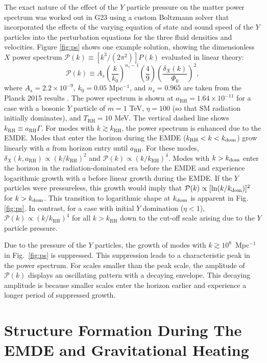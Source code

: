 \documentclass[a4paper,11pt]{article}
\newcommand{\rh}[1]{{#1}_{\mathrm{RH}}}
\begin{document}
The exact nature of the effect of the $Y$ particle pressure on the matter power spectrum was worked out in G23 using a custom Boltzmann solver that incorporated the effects of the varying equation of state and sound speed of the $Y$ particles into the perturbation equations for the three fluid densities and velocities. Figure \ref{fig:ps} shows one example solution, showing the dimensionless $X$ power spectrum $\mathcal{P}(k)\equiv[k^3/(2\pi^2)]P(k)$ evaluated in linear theory: \begin{equation}
    \mathcal{P}(k) \equiv A_s \left(\frac{k}{k_0} \right)^{n_s-1} \left( \frac{4}{9} \right) \left(\frac{\delta_X(k)}{\Phi_0} \right)^2,
\end{equation} where $A_s = 2.2 \times 10^{-9}$, $k_0 = 0.05$ Mpc$^{-1}$, and $n_s = 0.965$ are taken from the Planck 2015 results \cite{planck15}. The power spectrum is shown at $\rh{a} = 1.64 \times 10^{-11}$ for a case with a bosonic $Y$ particle of $m = 1$ TeV, $\eta = 100$ (so that SM radiation initially dominates), and $\rh{T} = 10$ MeV. The vertical dashed line shows $\rh{k} \equiv \rh{a} \Gamma$. For modes with $k \gtrsim \rh{k}$, the power spectrum is enhanced due to the EMDE. Modes that enter the horizon during the EMDE ($\rh{k} < k < k_{\rm dom}$) grow linearly with $a$ from horizon entry until $\rh{a}$. For these modes, $\delta_X(k,\rh{a}) \propto (k/\rh{k})^2$ and $\mathcal{P}(k) \propto (k/\rh{k})^4$. Modes with $k > k_{\rm dom}$ enter the horizon in the radiation-dominated era before the EMDE and experience logarithmic growth with $a$ before linear growth during the EMDE. If the $Y$ particles were pressureless, this growth would imply that $\mathcal{P}(k) \propto [\ln (k/k_{\rm dom})]^2$ for $k > k_{\rm dom}$. This transition to logarithmic shape at $k_{\rm dom}$ is apparent in Fig. \ref{fig:ps}. In contrast, for a case with initial $Y$ domination ($\eta<1$), $\mathcal{P}(k) \propto (k/\rh{k})^4$ for all $k > \rh{k}$ down to the cut-off scale arising due to the $Y$ particle pressure.


Due to the pressure of the $Y$ particles, the growth of modes with $k \gtrsim 10^8$~Mpc$^{-1}$ in Fig.~\ref{fig:ps} is suppressed. This suppression leads to a characteristic peak in the power spectrum. For scales smaller than the peak scale, the amplitude of $\mathcal{P}(k)$ displays an oscillating pattern with a decaying envelope. This decaying amplitude is because smaller scales enter the horizon earlier and experience a longer period of suppressed growth. 

\section{Structure Formation During The EMDE and Gravitational Heating}
\label{heating}
\end{document}
